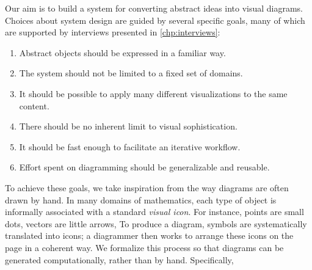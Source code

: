 Our aim is to build a system for converting abstract ideas into visual diagrams.  Choices about system design are guided by several specific goals, many of which are supported by interviews presented in \cref{chp:interviews}:
\begin{enumerate}
   \item Abstract objects should be expressed in a familiar way.\label{gol:FamiliarNotation} %
   \item The system should not be limited to a fixed set of domains.\label{gol:NoFixedDomains} %
   \item It should be possible to apply many different visualizations to the same content.\label{gol:ManyViz} %
   \item There should be no inherent limit to visual sophistication.\label{gol:sophistication}  %
   \item It should be fast enough to facilitate an iterative workflow.\label{gol:FastEnough}  %
   \item Effort spent on diagramming should be generalizable and reusable.\label{gol:Reuse}
\end{enumerate}

To achieve these goals, we take inspiration from the way diagrams are often drawn by hand.  In many domains of mathematics, each type of object is informally associated with a standard \emph{visual icon}.  For instance, points are small dots, vectors are little arrows, \etc{}  To produce a diagram, symbols are systematically translated into icons; a diagrammer then works to arrange these icons on the page in a coherent way.  We formalize this process so that diagrams can be generated computationally, rather than by hand.  Specifically,

